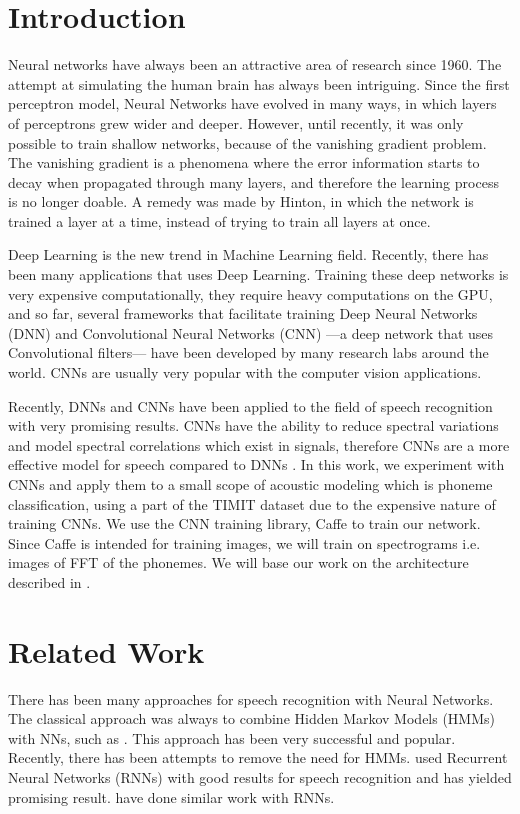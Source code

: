 \documentclass[a4paper,12pt]{report}
\begin{document}
\chapter{Introduction}

Neural networks have always been an attractive area of research since 1960. The attempt at simulating the human brain has always been intriguing. Since the first perceptron model, Neural Networks have evolved in many ways, in which layers of perceptrons grew wider and deeper. However, until recently, it was only possible to train shallow networks, because of the vanishing gradient problem. The vanishing gradient is a phenomena where the error information starts to decay when propagated through many layers, and therefore the learning process is no longer doable. A remedy was made by Hinton\cite{hinton2006reducing}, in which the network is trained a layer at a time, instead of trying to train all layers at once.

Deep Learning is the new trend in Machine Learning field. Recently, there has been many applications that uses Deep Learning. Training these deep networks is very expensive computationally, they require heavy computations on the GPU, and so far, several frameworks that facilitate training Deep Neural Networks (DNN) and Convolutional Neural Networks (CNN) ---a deep network that uses Convolutional filters--- have been developed by many research labs around the world. CNNs are usually very popular with the computer vision applications.

Recently, DNNs and CNNs have been applied to the field of speech recognition with very promising results. CNNs have the ability to reduce spectral variations and model spectral correlations which exist in signals, therefore CNNs are a more effective model for speech compared to DNNs \cite{sainath2013deep}. In this work, we experiment with CNNs and apply them to a small scope of acoustic modeling which is phoneme classification, using a part of the TIMIT dataset due to the expensive nature of training CNNs. We use the CNN training library, Caffe to train our network. Since Caffe is intended for training images, we will train on spectrograms i.e. images of FFT of the phonemes. We will base our work on the architecture described in \cite{sainath2013deep}.

\chapter{Related Work}
There has been many approaches for speech recognition with Neural Networks. The classical approach was always to combine Hidden Markov Models (HMMs) with NNs, such as \cite{robinson1994application}. This approach has been very successful and popular. Recently, there has been attempts to remove the need for HMMs. \cite{graves2013speech} used Recurrent Neural Networks (RNNs) with good results for speech recognition and has yielded promising result. \cite{graves2014towards} have done similar work with RNNs.
\end{document}
